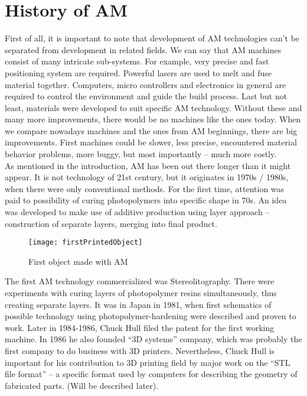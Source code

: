 \documentclass[a4paper]{report}
\begin{document}
\section{History of AM}
First of all, it is important to note that development of AM technologies can’t be separated from development in related fields. We can say that AM machines consist of many intricate sub-systems. For example, very precise and fast positioning system are required. Powerful lasers are used to melt and fuse material together. Computers, micro controllers and electronics in general are required to control the environment and guide the build process. Last but not least, materials were developed to suit specific AM technology. Without these and many more improvements, there would be no machines like the ones today. When we compare nowadays machines and the ones from AM beginnings, there are big improvements. First machines could be slower, less precise, encountered material behavior problems, more buggy, but most importantly – much more costly.\\
As mentioned in the introduction, AM has been out there longer than it might appear. It is not technology of 21st century, but it originates in 1970s / 1980s, when there were only conventional methods. For the first time, attention was paid to possibility of curing photopolymers into specific shape in 70s. An idea was developed to make use of additive production using layer approach – construction of separate layers, merging into final product.\\
\begin{wrapfigure}{r}{0.5\textwidth}
 	\texttt{[image: firstPrintedObject]}
	\caption{First object made with AM}
\end{wrapfigure}
The first AM technology commercialized was Stereolitography. There were experiments with curing layers of photopolymer resins simultaneously, thus creating separate layers. It was in Japan in 1981, when first schematics of possible technology using photopolymer-hardening were described and proven to work.  Later in 1984-1986, Chuck Hull filed the patent for the first working machine.  In 1986 he also founded “3D systems” company, which was probably the first company to do business with 3D printers. Nevertheless, Chuck Hull is important for his contribution to 3D printing field by major work on the “STL file format” – a specific format used by computers for describing the geometry of fabricated parts. (Will be described later).\\
\end{document}
